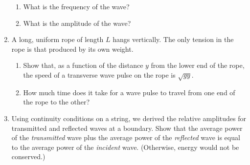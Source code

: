 \documentclass[../psets.tex]{subfiles}
\begin{document}
\begin{enumerate}[label={\arabic*)}]
    \begin{enumerate}
        \item What is the frequency of the wave?
        \item What is the amplitude of the wave?
    \end{enumerate}
    \item A long, uniform rope of length $L$ hangs vertically. The only tension in the rope is that produced by its own weight.
    \begin{enumerate}
        \item Show that, as a function of the distance $y$ from the lower end of the rope, the speed of a transverse wave pulse on the rope is $\sqrt{gy}$.
        \item How much time does it take for a wave pulse to travel from one end of the rope to the other?
    \end{enumerate}
    \item Using continuity conditions on a string, we derived the relative amplitudes for transmitted and reflected waves at a boundary. Show that the average power of the \emph{transmitted} wave plus the average power of the \emph{reflected} wave is equal to the average power of the \emph{incident} wave. (Otherwise, energy would not be conserved.)
\end{enumerate}
\end{document}
